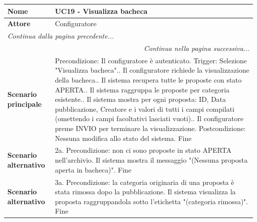 \documentclass[12pt, a4paper, oneside]{report}
\begin{document}
\renewcommand{\arraystretch}{1.4} 

\begin{tabularx}{\textwidth}{|l|X|}
    \hline
    \textbf{Nome}               & \textbf{UC19 - Visualizza bacheca} \\ \hline
    \textbf{Attore}             & Configuratore \\ \hline
    \endfirsthead 

    \hline
    \multicolumn{2}{|l|}{\textit{Continua dalla pagina precedente...}} \\ \hline
    \endhead 

    \hline
    \multicolumn{2}{|r|}{\textit{Continua nella pagina successiva...}} \\ \hline
    \endfoot 

    \hline
    \endlastfoot

    \textbf{Scenario principale} & 
    Precondizione: Il configuratore è autenticato.\newline
    Trigger: Selezione "Visualizza bacheca".\newline
    1. Il configuratore richiede la visualizzazione della bacheca.\newline
    2. Il sistema recupera tutte le proposte con stato APERTA.\newline
    3. Il sistema raggruppa le proposte per categoria esistente.\newline
    4. Il sistema mostra per ogni proposta: ID, Data pubblicazione, Creatore e i valori di tutti i campi compilati (omettendo i campi facoltativi lasciati vuoti).\newline
    5. Il configuratore preme INVIO per terminare la visualizzazione.\newline
    Postcondizione: Nessuna modifica allo stato del sistema. \newline
    Fine \\ \hline
    
    \textbf{Scenario alternativo} & 
    2a. Precondizione: non ci sono proposte in stato APERTA nell'archivio.\newline
    Il sistema mostra il messaggio "(Nessuna proposta aperta in bacheca)".\newline
    Fine \\ \hline

    \textbf{Scenario alternativo} & 
    3a. Precondizione: la categoria originaria di una proposta è stata rimossa dopo la pubblicazione.\newline
    Il sistema visualizza la proposta raggruppandola sotto l'etichetta "(categoria rimossa)".\newline
    Fine \\ \hline
\end{tabularx}
\end{document}
